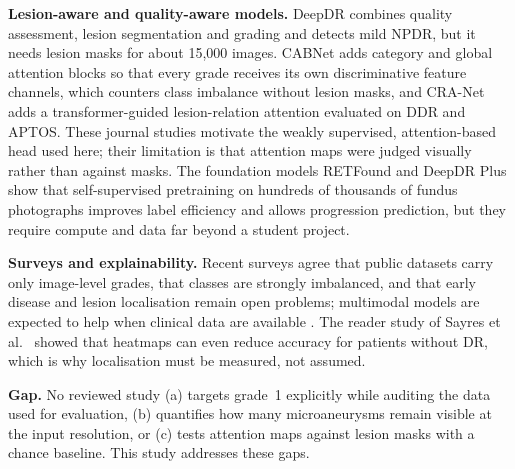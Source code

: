 \documentclass[11pt,a4paper]{article}
\begin{document}
\textbf{Lesion-aware and quality-aware models.} DeepDR \cite{dai2021} combines quality assessment, lesion segmentation and grading and detects mild NPDR, but it needs lesion masks for about 15{,}000 images. CABNet \cite{he2021} adds category and global attention blocks so that every grade receives its own discriminative feature channels, which counters class imbalance without lesion masks, and CRA-Net \cite{ma2024} adds a transformer-guided lesion-relation attention evaluated on DDR and APTOS. These journal studies motivate the weakly supervised, attention-based head used here; their limitation is that attention maps were judged visually rather than against masks. The foundation models RETFound \cite{zhou2023} and DeepDR Plus \cite{dai2024} show that self-supervised pretraining on hundreds of thousands of fundus photographs improves label efficiency and allows progression prediction, but they require compute and data far beyond a student project.

\textbf{Surveys and explainability.} Recent surveys \cite{tsiknakis2021,bhulakshmi2024} agree that public datasets carry only image-level grades, that classes are strongly imbalanced, and that early disease and lesion localisation remain open problems; multimodal models are expected to help when clinical data are available \cite{qin2026}. The reader study of Sayres et al.\ \cite{sayres2019} showed that heatmaps can even reduce accuracy for patients without DR, which is why localisation must be measured, not assumed.

\textbf{Gap.} No reviewed study (a) targets grade~1 explicitly while auditing the data used for evaluation, (b) quantifies how many microaneurysms remain visible at the input resolution, or (c) tests attention maps against lesion masks with a chance baseline. This study addresses these gaps.
\end{document}
